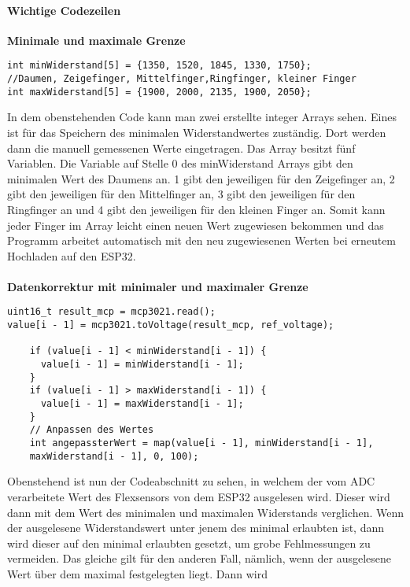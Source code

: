 \documentclass[titlepage,12pt,twoside]{article}
\begin{document}
\paragraph{Wichtige Codezeilen}
\label{par:Wichtige Codezeilen}
\hfill \break
\hfill \break
\textbf{Minimale und maximale Grenze} \\
\footnotesize
\begin{lstlisting}
int minWiderstand[5] = {1350, 1520, 1845, 1330, 1750};  
//Daumen, Zeigefinger, Mittelfinger,Ringfinger, kleiner Finger
int maxWiderstand[5] = {1900, 2000, 2135, 1900, 2050};
\end{lstlisting}
\hfill \break
\normalsize
In dem obenstehenden Code kann man zwei erstellte integer Arrays sehen. Eines ist 
für das Speichern des minimalen Widerstandwertes zuständig. Dort werden dann die 
manuell gemessenen Werte eingetragen. Das Array besitzt fünf Variablen. Die Variable 
auf Stelle 0 des minWiderstand Arrays gibt den minimalen Wert des Daumens an. 1 gibt 
den jeweiligen für den Zeigefinger an, 2 gibt den jeweiligen für den Mittelfinger an, 
3 gibt den jeweiligen für den Ringfinger an und 4 gibt den jeweiligen für den 
kleinen Finger an. Somit kann jeder Finger im Array leicht einen neuen Wert 
zugewiesen bekommen und das Programm arbeitet automatisch mit den neu zugewiesenen 
Werten bei erneutem Hochladen auf den ESP32. \\
\\
\textbf{Datenkorrektur mit minimaler und maximaler Grenze} \\
\footnotesize
\begin{lstlisting}
uint16_t result_mcp = mcp3021.read();
value[i - 1] = mcp3021.toVoltage(result_mcp, ref_voltage);

    if (value[i - 1] < minWiderstand[i - 1]) {
      value[i - 1] = minWiderstand[i - 1];
    }
    if (value[i - 1] > maxWiderstand[i - 1]) {
      value[i - 1] = maxWiderstand[i - 1];
    }
    // Anpassen des Wertes
    int angepassterWert = map(value[i - 1], minWiderstand[i - 1],
	maxWiderstand[i - 1], 0, 100);
\end{lstlisting}
\hfill \break
\normalsize
Obenstehend ist nun der Codeabschnitt zu sehen, in welchem der vom ADC verarbeitete 
Wert des Flexsensors von dem ESP32 ausgelesen wird. Dieser wird dann mit dem Wert 
des minimalen und maximalen Widerstands verglichen. Wenn der ausgelesene Widerstandswert 
unter jenem des minimal erlaubten ist, dann wird dieser auf den minimal erlaubten 
gesetzt, um grobe Fehlmessungen zu vermeiden. Das gleiche gilt für den anderen Fall, 
nämlich, wenn der ausgelesene Wert über dem maximal festgelegten liegt. Dann wird 
\end{document}
